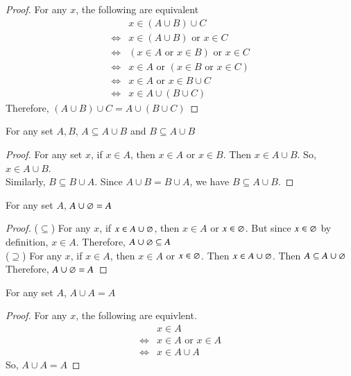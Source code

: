 \begin{proof}
    For any $x$, the following are equivalent 
    \begin{align*}
        & x\in (A\cup B)\cup C\\
        \Leftrightarrow & x\in (A\cup B)\text{ or }x\in C\\
        \Leftrightarrow & (x\in A\text{ or }x\in B)\text{ or }x\in C\\
        \Leftrightarrow & x\in A\text{ or }(x\in B\text{ or }x\in C)\\
        \Leftrightarrow & x\in A \text{ or }x\in B\cup C\\
        \Leftrightarrow & x\in A \cup(B\cup C)
    \end{align*}
    Therefore, $(A\cup B)\cup C = A\cup (B\cup C)$
\end{proof}
\begin{prop}
    {For any set $A,B$, $A\subseteq A\cup B$ and $B\subseteq A\cup B$}
\end{prop}
\begin{proof}
    For any set $x$, if $x\in A$, then $x\in A$ or $x\in B$. Then $x\in A\cup B$. So, $x\in A\cup B$.\\
    Similarly, $B\subseteq B\cup A$. Since $A\cup B = B\cup A$, we have $B\subseteq A\cup B$.
\end{proof}
\begin{prop}
    {For any set $A$, $A\cup\varnothing = A$}
\end{prop}
\begin{proof}
    ($\subseteq$) For any $x$, if $x\in A\cup \varnothing$, then $x\in A$ or $x\in \varnothing$. But since $x\in\varnothing$ by definition, $x\in A$. Therefore, $A\cup \varnothing\subseteq A$\\
    ($\supseteq$) For any $x$, if $x\in A$, then $x\in A$ or $x\in \varnothing$. Then $x\in A\cup \varnothing$. Then $A\subseteq A\cup\varnothing$\\
    Therefore, $A\cup\varnothing = A$
\end{proof}
\begin{prop}
    {For any set $A$, $A\cup A = A$}
\end{prop}
\begin{proof}
    For any $x$, the following are equivlent. 
    \begin{align*}
        & x\in A\\
        \Leftrightarrow & x\in A \text{ or }x\in A\\
        \Leftrightarrow & x\in A\cup A
    \end{align*}
    So, $A\cup A = A$
\end{proof}
